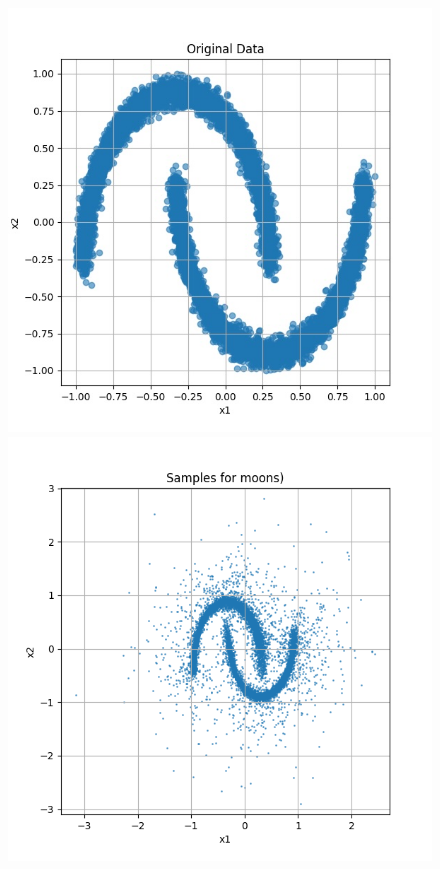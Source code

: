 \documentclass[a4paper,12pt]{article}
\begin{document}
\begin{figure}[H]
  \centering
  \begin{minipage}{0.3\textwidth}
      \centering
      \includegraphics[width=\linewidth]{images/moon.jpg}
  \end{minipage}
  \begin{minipage}{0.3\textwidth}
      \centering
      \includegraphics[width=\linewidth]{"images/Samples for ddpm_2_10_0.0001_0.02_moons.png"}

\end{minipage}
\end{figure}
\end{document}
